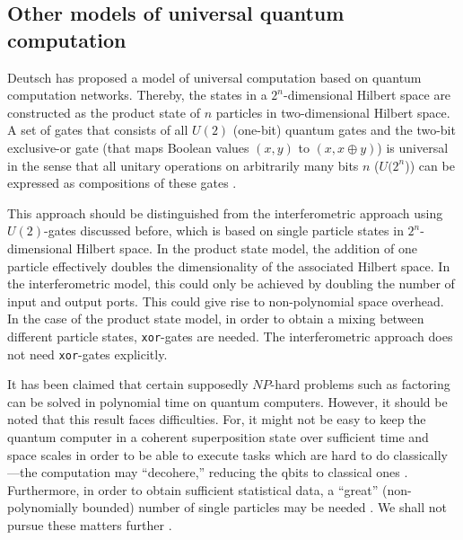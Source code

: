 \subsection{Other models of universal quantum computation}

Deutsch \cite{deutsch:89} has proposed a model of universal computation
based on quantum computation networks.
Thereby, the states
in a $2^n$-dimensional Hilbert space are constructed as the product
state of $n$ particles in two-dimensional Hilbert space.
A set of gates that consists of all $U(2)$ (one-bit) quantum gates
and the two-bit exclusive-or gate (that maps Boolean values
$(x,y)$ to $(x,x \oplus y)$) is universal in the sense that all unitary
operations on arbitrarily many bits $n$ ($U(2^n$)) can be expressed as
compositions of these gates \cite{barenco}.

This approach should be distinguished from the
interferometric
approach using $U(2)$-gates discussed before, which is based on single
particle states in $2^n$-dimensional Hilbert space.
In the product state model, the addition of one particle
effectively doubles the dimensionality of the associated Hilbert space.
In the interferometric model, this  could only be achieved by doubling
the number of input and output ports. This could give rise to
non-polynomial space overhead.
In the case of the product state model,
in order to obtain
a mixing between different particle states,  {\tt xor}-gates are
needed. The interferometric approach does not need {\tt xor}-gates
explicitly.

It has been claimed
\cite{shor:94,shor:95}
that certain supposedly $NP$-hard
problems such as factoring can be solved in polynomial time
on quantum computers.
However, it should be noted that this result faces difficulties.
For,
it might not be easy to keep the quantum computer in a coherent
superposition state over sufficient time and space scales in order to be
able to execute tasks which are hard to do classically---the
computation may ``decohere,'' reducing the qbits to classical ones
\cite{landauer-decoherence2}.
 Furthermore,
in order to obtain sufficient statistical data, a ``great''
(non-polynomially bounded) number of single particles may be needed
\cite{svozil-atten}.
 We shall not pursue these matters further
\cite{deutsch:92,be-va,be-br,benioff-82a,cerny-90,shor:94}.



